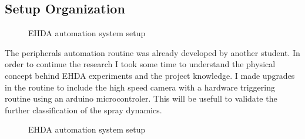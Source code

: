 \subsection{Setup Organization}
\label{subsec:setup_organization}


\begin{figure}[H]
  \centering
  \caption{EHDA automation system setup}
  \label{fig:setup_pic}
\end{figure}


The peripherals automation routine was already developed by another student. In order to continue the research I took some time to understand the physical concept behind EHDA experiments and the project knowledge.
I made upgrades in the routine to include the high speed camera with a hardware triggering routine using an arduino microcontroler. This will be usefull to validate the further classification of the spray dynamics.


\begin{figure}[H]
  \centering
  \caption{EHDA automation system setup}
  \label{fig:setup}
\end{figure}


